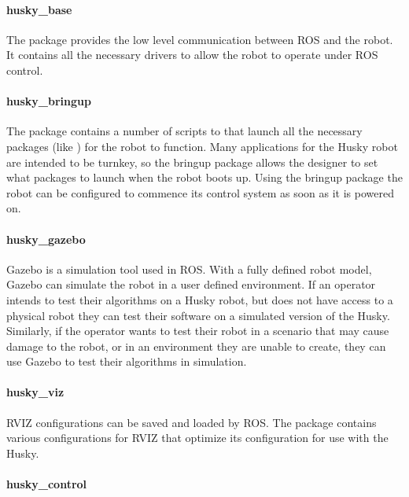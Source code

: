 \paragraph{husky\_base}

The  package provides the low level communication between ROS and the robot. It contains all the necessary drivers to allow the robot to operate under ROS control.\\

\paragraph{husky\_bringup}

The  package contains a number of scripts to that launch all the necessary packages (like ) for the robot to function. Many applications for the Husky robot are intended to be turnkey, so the bringup package allows the designer to set what packages to launch when the robot boots up. Using the bringup package the robot can be configured to commence its control system as soon as it is powered on.\\

\paragraph{husky\_gazebo}

Gazebo is a simulation tool used in ROS. With a fully defined robot model, Gazebo can simulate the robot in a user defined environment. If an operator intends to test their algorithms on a Husky robot, but does not have access to a physical robot they can test their software on a simulated version of the Husky. Similarly, if the operator wants to test their robot in a scenario that may cause damage to the robot, or in an environment they are unable to create, they can use Gazebo to test their algorithms in simulation.\\

\paragraph{husky\_viz}

RVIZ configurations can be saved and loaded by ROS. The  package contains various configurations for RVIZ that optimize its configuration for use with the Husky.\\

\paragraph{husky\_control}

